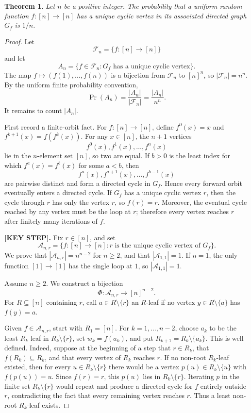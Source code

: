 \documentclass[11pt]{article}
\newtheorem*{theorem}{Theorem}
\begin{document}
\begin{theorem}
Let \(n\) be a positive integer. The probability that a uniform random function
\(f:[n]\to[n]\) has a unique cyclic vertex in its associated directed graph \(G_f\)
is \(1/n\).
\end{theorem}

\begin{proof}
Let
\[
\mathcal F_n=\{f:[n]\to[n]\}
\]
and let
\[
A_n=\{f\in\mathcal F_n: G_f\text{ has a unique cyclic vertex}\}.
\]
The map \(f\mapsto(f(1),\ldots,f(n))\) is a bijection from \(\mathcal F_n\) to
\([n]^n\), so \(|\mathcal F_n|=n^n\). By the uniform finite probability
convention,
\[
\Pr(A_n)=\frac{|A_n|}{|\mathcal F_n|}=\frac{|A_n|}{n^n}.
\]
It remains to count \(|A_n|\).

First record a finite-orbit fact. For \(f:[n]\to[n]\), define \(f^0(x)=x\) and
\(f^{k+1}(x)=f(f^k(x))\). For any \(x\in[n]\), the \(n+1\) vertices
\[
f^0(x),f^1(x),\ldots,f^n(x)
\]
lie in the \(n\)-element set \([n]\), so two are equal. If \(b>0\) is the least
index for which \(f^a(x)=f^b(x)\) for some \(a<b\), then
\[
f^a(x),f^{a+1}(x),\ldots,f^{b-1}(x)
\]
are pairwise distinct and form a directed cycle in \(G_f\). Hence every forward
orbit eventually enters a directed cycle. If \(G_f\) has a unique cyclic vertex
\(r\), then the cycle through \(r\) has only the vertex \(r\), so \(f(r)=r\).
Moreover, the eventual cycle reached by any vertex must be the loop at \(r\);
therefore every vertex reaches \(r\) after finitely many iterations of \(f\).

\medskip
\noindent\textbf{[KEY STEP].} Fix \(r\in[n]\), and set
\[
\mathcal A_{n,r}=\{f:[n]\to[n]\colon r\text{ is the unique cyclic vertex of }G_f\}.
\]
We prove that \(|\mathcal A_{n,r}|=n^{n-2}\) for \(n\ge2\), and that
\(|\mathcal A_{1,1}|=1\). If \(n=1\), the only function \([1]\to[1]\) has the
single loop at \(1\), so \(|\mathcal A_{1,1}|=1\).

Assume \(n\ge2\). We construct a bijection
\[
\Phi:\mathcal A_{n,r}\to [n]^{n-2}.
\]
For \(R\subseteq[n]\) containing \(r\), call \(a\in R\setminus\{r\}\) an
\(R\)-leaf if no vertex \(y\in R\setminus\{a\}\) has \(f(y)=a\).

Given \(f\in\mathcal A_{n,r}\), start with \(R_1=[n]\). For
\(k=1,\ldots,n-2\), choose \(a_k\) to be the least \(R_k\)-leaf in
\(R_k\setminus\{r\}\), set \(w_k=f(a_k)\), and put
\(R_{k+1}=R_k\setminus\{a_k\}\). This is well-defined. Indeed, suppose at the
beginning of a step that \(r\in R_k\), that \(f(R_k)\subseteq R_k\), and that
every vertex of \(R_k\) reaches \(r\). If no non-root \(R_k\)-leaf existed, then
for every \(u\in R_k\setminus\{r\}\) there would be a vertex
\(p(u)\in R_k\setminus\{u\}\) with \(f(p(u))=u\). Since \(f(r)=r\), this
\(p(u)\) lies in \(R_k\setminus\{r\}\). Iterating \(p\) in the finite set
\(R_k\setminus\{r\}\) would repeat and produce a directed cycle for \(f\)
entirely outside \(r\), contradicting the fact that every remaining vertex
reaches \(r\). Thus a least non-root \(R_k\)-leaf exists.


\end{proof}
\end{document}
